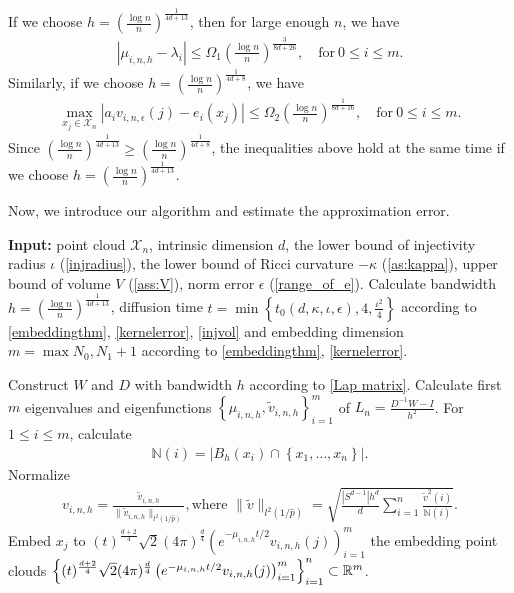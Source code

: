 \begin{remark}
If we choose $h=(\frac{\log n}{n})^{\frac{1}{4d+13}}$, then for large enough $n$, we have
\begin{align}
	|\mu_{i,n,h}-\lambda_{i}|\leq \Omega_1 (\frac{\log n}{n})^{\frac{3}{8d+26}}, \quad \text{for}\ 0\leq i \leq m.
\end{align}
Similarly, if we choose $h=(\frac{\log n}{n})^{\frac{1}{4d+8}}$, we have
\begin{align}
	\max_{x_j \in \mathcal{X}_n}|a_i v_{i,n,\epsilon}(j)-e_{i}(x_j)|\leq  \Omega_2 (\frac{\log n}{n})^{\frac{1}{8d+16}}, \quad \text{for}\ 0\leq i \leq m.
\end{align}
Since $(\frac{\log n}{n})^{\frac{1}{4d+13}} \geq (\frac{\log n}{n})^{\frac{1}{4d+8}}$, the inequalities above hold at the same time if we choose $h=(\frac{\log n}{n})^{\frac{1}{4d+13}}$.
\end{remark}

Now, we introduce our algorithm and estimate the approximation error.
\begin{algorithm}[H]
	\renewcommand{\algorithmicrequire}{\textbf{Input: }}
	\renewcommand{\algorithmicensure}{\textbf{Output: }}
	\caption{Diffusion Map}
	\label{alg1}
	\begin{algorithmic}[1]
		\State \algorithmicrequire  point cloud $\mathcal{X}_n$, intrinsic dimension $d$, the lower bound of injectivity radius $\iota$ (\cref{injradius}), the lower bound of Ricci curvature $-\kappa$ (\cref{as:kappa}), upper bound of volume $V$ (\cref{ass:V}), norm error $\epsilon$ (\cref{range_of_e}).
		\State Calculate bandwidth $h=(\frac{\log n}{n})^{\frac{1}{4d+13}}$, diffusion time $t=\min\left\{t_0(d,\kappa,\iota,\epsilon),4,\frac{\iota^2}{4}\right\}$ according to \cref{embeddingthm}, \cref{kernelerror}, \cref{injvol}
		and embedding dimension $m=\max{N_0, N_1}+1$ according to \cref{embeddingthm}, \cref{kernelerror}.
	
			
		\State Construct $W$ and $D$ with bandwidth $h$ according to \cref{Lap matrix}.
		\State Calculate first $m$ eigenvalues and eigenfunctions $\left\{\mu_{i,n,h},\tilde{v}_{i,n,h}\right\}_{i=1}^m$ of $L_n=\frac{D^{-1}W-I}{h^2}$.
		\State For $1\leq i \leq m$, calculate \begin{align}
			\mathbb{N}(i)=|B_h(x_i) \cap \left\{x_1,\dots,x_n\right\}|.
		\end{align}
		Normalize 
		\begin{align}
			v_{i,n,h}=\frac{\tilde{v}_{i,n,h}}{\|\tilde{v}_{i,n,h}\|_{l^2(1/\hat{p})}}, \text{where } \|\tilde{v}\|_{l^2(1/\hat{p})} = 	\sqrt{\frac{|S^{d-1}|h^d}{d}\sum_{i=1}^{n}\frac{\tilde{v}^2(i)}{\mathbb{N}(i)}} .
		\end{align}
		\State Embed $x_j$ to $(t)^\frac{d+2}{4}\sqrt{2}(4\pi)^\frac{d}{4}\left(e^{-\mu_{i,n,h}t/2}v_{i,n,h}(j)\right)_{i=1}^m$
		\Ensure the embedding point clouds $\left\{(t)^\frac{d+2}{4}\sqrt{2}(4\pi)^\frac{d}{4}\left(e^{-\mu_{i,n,h}t/2}v_{i,n,h}(j)\right)_{i=1}^m\right\}_{i=1}^n \subset \mathbb{R}^m$.
	\end{algorithmic}
\end{algorithm}

